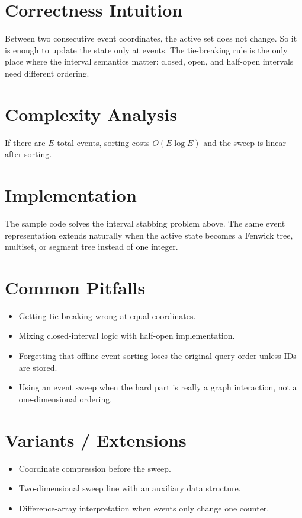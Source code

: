 \section*{Correctness Intuition}

Between two consecutive event coordinates, the active set does not change. So it is enough to update the state only at
events. The tie-breaking rule is the only place where the interval semantics matter: closed, open, and half-open
intervals need different ordering.

\section*{Complexity Analysis}

If there are \(E\) total events, sorting costs \(O(E \log E)\) and the sweep is linear after sorting.

\section*{Implementation}

The sample code solves the interval stabbing problem above. The same event representation extends naturally when the
active state becomes a Fenwick tree, multiset, or segment tree instead of one integer.

\section*{Common Pitfalls}

\begin{itemize}
  \item Getting tie-breaking wrong at equal coordinates.
  \item Mixing closed-interval logic with half-open implementation.
  \item Forgetting that offline event sorting loses the original query order unless IDs are stored.
  \item Using an event sweep when the hard part is really a graph interaction, not a one-dimensional ordering.
\end{itemize}

\section*{Variants / Extensions}

\begin{itemize}
  \item Coordinate compression before the sweep.
  \item Two-dimensional sweep line with an auxiliary data structure.
  \item Difference-array interpretation when events only change one counter.
\end{itemize}

